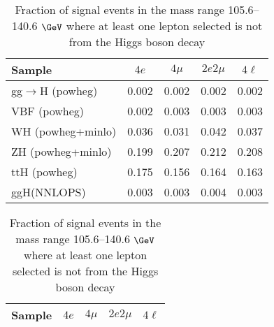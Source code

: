 \begin{table}[!h!tb]
\begin{center}
\small
\caption{
Fraction of signal events in the mass range 105.6--140.6 $\GeV$ where at least one lepton selected is not from the Higgs boson decay
\label{tab:wrongracSM}
}
\begin{tabular}{|l|c|c|c|c|} \hline 
Sample & $4e$ & $4\mu$ & $2e2\mu$ & $4\ell$ \\ \hline 
gg$\rightarrow$H ({\sc powheg})  & 0.002 & 0.002 & 0.002 & 0.002 \\ 
VBF ({\sc powheg})  & 0.002 & 0.003 & 0.003 & 0.003 \\ 
WH ({\sc powheg+minlo}) & 0.036 & 0.031 & 0.042 & 0.037 \\ 
ZH ({\sc powheg+minlo})  & 0.199 & 0.207 & 0.212 & 0.208 \\ 
ttH ({\sc powheg}) & 0.175 & 0.156 & 0.164 & 0.163 \\ 
ggH(NNLOPS) & 0.003 & 0.003 & 0.004 & 0.003 \\ 

\hline
\end{tabular}
\normalsize
\end{center}
\end{table}
 
 
 
\begin{table}[!h!tb]
\begin{center}
\small
\caption{
Fraction of signal events in the mass range 105.6--140.6 $\GeV$ where at least one lepton selected is not from the Higgs boson decay
\label{tab:wrongfracExo}
}
\begin{tabular}{|l|c|c|c|c|} \hline 
Sample & $4e$ & $4\mu$ & $2e2\mu$ & $4\ell$ \\ \hline 

\hline
\end{tabular}
\normalsize
\end{center}
\end{table}
 
 
 
